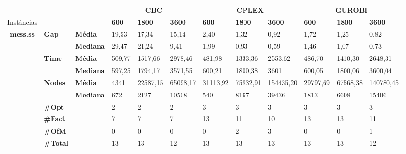 \documentclass[]{article}
\begin{document}
	
	\begin{table}[]
		\begin{adjustbox}{angle=90}
			\begin{tabular}{cll|lll|lll|lll}
				& & & \multicolumn{3}{c}{\textbf{CBC}} & \multicolumn{3}{c}{\textbf{CPLEX}} & \multicolumn{3}{c}{\textbf{GUROBI}} 	\\Instâncias & & & \textbf{600} & \textbf{1800} & \textbf{3600} & \textbf{600} & \textbf{1800} & \textbf{3600} & \textbf{600} & \textbf{1800} & \textbf{3600} \\
				\hline
				\multirow{7}{*}{\textbf{mess.ss}} & \multirow{2}{*}{\textbf{Gap}} & \textbf{Média} & 19,53 & 17,34 & 15,14 & 2,40 & 1,32 & 0,92 & 1,72 & 1,25 & 0,82 \\
				& & \textbf{Mediana} & 29,47 & 21,24 & 9,41 & 1,99 & 0,93 & 0,59 & 1,46 & 1,07 & 0,73 \\
				\cline{2-12}
				& \multirow{2}{*}{\textbf{Time}} & \textbf{Média} & 509,77 & 1517,66 & 2978,46 & 481,98 & 1333,36 & 2553,62 & 486,70 & 1410,30 & 2648,31 \\
				& & \textbf{Mediana} & 597,25 & 1794,17 & 3571,55 & 600,21 & 1800,38 & 3601 & 600,05 & 1800,06 & 3600,04 \\
				\cline{2-12}
				& \multirow{2}{*}{\textbf{Nodes}} & \textbf{Média} & 4341 & 22587,15 & 65098,17 & 31113,92 & 75832,91 & 154435,20 & 29797,69 & 67568,38 & 140780,45 \\
				& & \textbf{Mediana} & 672 & 2127 & 10508 & 540 & 8167 & 39436 & 1813 & 6608 & 15406 \\
				\cline{2-12}
				& \textbf{\#Opt} & & 2 & 2 & 2 & 3 & 3 & 3 & 3 & 3 & 3 \\
				& \textbf{\#Fact} & & 7 & 7 & 7 & 13 & 11 & 10 & 13 & 13 & 11 \\
				& \textbf{\#OfM} & & 0 & 0 & 0 & 0 & 2 & 3 & 0 & 0 & 1 \\
				& \textbf{\#Total} & & 13 & 13 & 12 & 13 & 13 & 13 & 13 & 13 & 12 \\
			\end{tabular}
		\end{adjustbox}
	\end{table}
	
\end{document}
